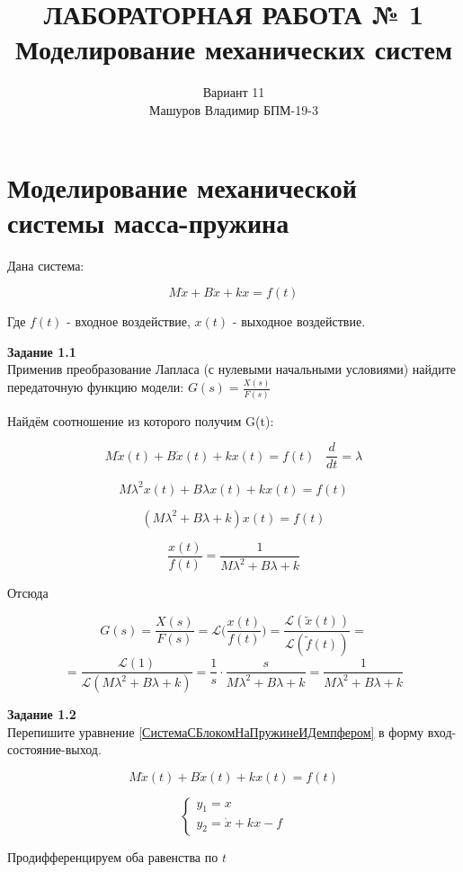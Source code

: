 \documentclass[a4paper, 12pt]{article}
\title{ЛАБОРАТОРНАЯ РАБОТА № 1 \\
Моделирование механических систем
}
\author{Вариант 11 \\ Машуров Владимир БПМ-19-3}
\begin{document}
\maketitle
\thispagestyle{empty}
\newpage
\tableofcontents

\section{Моделирование механической системы масса-пружина}

Дана система:

\begin{equation}
M\dot{x} + B\dot{x} + kx = f(t)
\label{СистемаСБлокомНаПружинеИДемпфером}
\end{equation}

Где $f(t)$ - входное воздействие, $x(t)$ - выходное воздействие.
 
\textbf{Задание 1.1 } \\
Применив преобразование Лапласа (с нулевыми начальными условиями) найдите передаточную функцию модели: $ G(s) = \frac{X(s)}{F(s)} $ 

Найдём соотношение из которого получим G(t):


$$M\dot{x}(t) + B\dot{x}(t) + kx(t) = f(t) \; \; \; \frac{d}{dt} = \lambda $$

$$ M\lambda^2x(t) + B\lambda x(t) + kx(t) = f(t) $$

$$ (M\lambda^2 + B\lambda + k)x(t) = f(t) $$

$$ \frac{x(t)}{f(t)} = \frac{1}{M\lambda^2 + B\lambda + k} $$

Отсюда

$$ G(s) = \frac{X(s)}{F(s)} = \mathcal{L} \bigg( \frac{x(t)}{f(t)} \bigg) = \frac{\mathcal{L}(\tilde{x}(t))}{\mathcal{L}(\tilde{f}(t))} = $$
$$ = \frac{\mathcal{L}(1)}{\mathcal{L}(M\lambda^2 + B\lambda + k)} =  \frac{1}{s} \cdot \frac{s}{M\lambda^2 + B\lambda + k} = \frac{1}{M\lambda^2 + B\lambda + k} $$

\textbf{Задание 1.2 } \\
Перепишите уравнение \ref{СистемаСБлокомНаПружинеИДемпфером} в форму вход-состояние-выход.

$$M\ddot{x}(t) + B\dot{x}(t) + kx(t) = f(t) $$ 

$$ \begin{cases}
y_1 = x \\
y_2 = \dot{x} + kx - f
\end{cases} $$

Продифференцируем оба равенства по $t$
\end{document}
